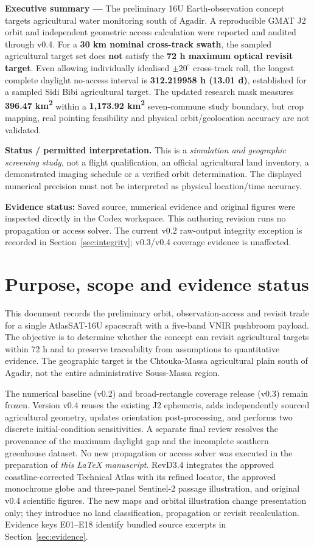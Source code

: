 \documentclass[10pt,a4paper]{article}
\newcommand{\sourceflag}{\textbf{Evidence status:} Saved source, numerical evidence and original figures were inspected directly in the Codex workspace. This authoring revision runs no propagation or access solver. The current v0.2 raw-output integrity exception is recorded in Section~\ref{sec:integrity}; v0.3/v0.4 coverage evidence is unaffected.}
\begin{document}
\begin{infobox}
\textbf{\textcolor{atlasblue}{Executive summary ---}}
The preliminary 16U Earth-observation concept targets agricultural water monitoring south of Agadir. A reproducible GMAT J2 orbit and independent geometric access calculation were reported and audited through v0.4. For a \textbf{30 km nominal cross-track swath}, the sampled agricultural target set does \textbf{not} satisfy the \textbf{72 h maximum optical revisit target}. Even allowing individually idealised \(\pm20^\circ\) cross-track roll, the longest complete daylight no-access interval is \textbf{312.219958 h (13.01 d)}, established for a sampled Sidi Bibi agricultural target. The updated research mask measures \textbf{396.47 km\textsuperscript{2}} within a \textbf{1,173.92 km\textsuperscript{2}} seven-commune study boundary, but crop mapping, real pointing feasibility and physical orbit/geolocation accuracy are not validated.
\end{infobox}
\begin{warnbox}
\textbf{Status / permitted interpretation.} This is a \emph{simulation and geographic screening study}, not a flight qualification, an official agricultural land inventory, a demonstrated imaging schedule or a verified orbit determination. The displayed numerical precision must not be interpreted as physical location/time accuracy.\par\sourceflag
\end{warnbox}
\newpage
{\fontsize{9}{11}\selectfont\setlength{\parskip}{0pt}\tableofcontents}
\newpage

\section{Purpose, scope and evidence status}
This document records the preliminary orbit, observation-access and revisit trade for a single AtlasSAT-16U spacecraft with a five-band VNIR pushbroom payload. The objective is to determine whether the concept can revisit agricultural targets within 72 h and to preserve traceability from assumptions to quantitative evidence. The geographic target is the Chtouka-Massa agricultural plain south of Agadir, not the entire administrative Souss-Massa region.

The numerical baseline (v0.2) and broad-rectangle coverage release (v0.3) remain frozen. Version v0.4 reuses the existing J2 ephemeris, adds independently sourced agricultural geometry, updates orientation post-processing, and performs two discrete initial-condition sensitivities. A separate final review resolves the provenance of the maximum daylight gap and the incomplete southern greenhouse dataset. No new propagation or access solver was executed in the preparation of \emph{this LaTeX manuscript}. RevD3.4 integrates the approved coastline-corrected Technical Atlas with its refined locator, the approved monochrome globe and three-panel Sentinel-2 passage illustration, and original v0.4 scientific figures. The new maps and orbital illustration change presentation only; they introduce no land classification, propagation or revisit recalculation. Evidence keys E01--E18 identify bundled source excerpts in Section~\ref{sec:evidence}.
\end{document}

